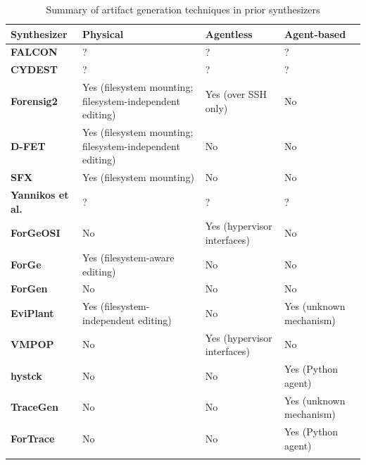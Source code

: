 \documentclass[final,5p,times,twocolumn]{elsarticle}
\begin{document}
\begin{table}[tb]
\footnotesize
\centering
\begin{tabularx}{\linewidth}{L{0.2} L{0.2666} L{0.2666} L{0.2666}}
\toprule
  \textbf{Synthesizer} & \textbf{Physical} & \textbf{Agentless} & \textbf{Agent-based} \\
\midrule
  \textbf{FALCON} \citep{adelsteinAutomaticallyCreatingRealistic2005} &
  ? & ? & ? \\
  \textbf{CYDEST} \citep{bruecknerAutomatedComputerForensics2008} & ? &
  ? & ? \\
  \textbf{Forensig2}
  \citep{mochForensicImageGenerator2009,mochEvaluatingForensicImage2012}
  & Yes (filesystem mounting; filesystem-independent editing) & Yes (over
  SSH only) & No \\
  \textbf{D-FET} \citep{williamCloudbasedDigitalForensics2011} & Yes
  (filesystem mounting; filesystem-independent editing) & No & No \\
  \textbf{SFX} \citep{russellForensicImageDescription2012} & Yes
  (filesystem mounting) & No & No \\
  \textbf{Yannikos et al.} \citep{yannikosDataCorporaDigital2014} & ? &
  ? & ? \\
  \textbf{ForGeOSI} \citep{maxfraggMaxfraggForGeOSI2023} & No & Yes
  (hypervisor interfaces) & No \\
  \textbf{ForGe} \citep{vistiAutomaticCreationComputer2015} & Yes
  (filesystem-aware editing) & No & No \\
  \textbf{ForGen} \citep{jjk422Jjk422ForGen2019} & No & No & No \\
  \textbf{EviPlant} \citep{scanlonEviPlantEfficientDigital2017} & Yes
  (filesystem-independent editing) & No & Yes (unknown mechanism) \\
  \textbf{VMPOP} \citep{parkTREDEVMPOPCultivating2018} & No & Yes
  (hypervisor interfaces) & No \\
  \textbf{hystck} \citep{gobelNovelApproachGenerating2020} & No & No &
  Yes (Python agent) \\
  \textbf{TraceGen} \citep{duTraceGenUserActivity2021} & No & No & Yes
  (unknown mechanism) \\
  \textbf{ForTrace} \citep{gobelForTraceHolisticForensic2022} & No & No
  & Yes (Python agent) \\ \\
\bottomrule
\end{tabularx}
\caption{Summary of artifact generation techniques in prior synthesizers}\label{tbl:prior-techniques}
\end{table}
\end{document}
